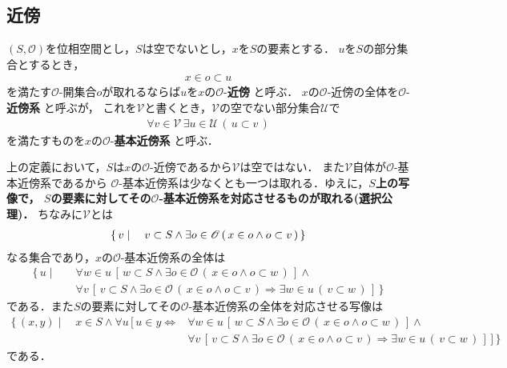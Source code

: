 \subsection{近傍}
	\begin{screen}
		\begin{dfn}[近傍]
			$(S,\mathscr{O})$を位相空間とし，$S$は空でないとし，$x$を$S$の要素とする．
			$u$を$S$の部分集合とするとき，
			\begin{align}
				x \in o \subset u
			\end{align}
			を満たす$\mathscr{O}$-開集合$o$が取れるならば$u$を$x$の$\mathscr{O}$-{\bf 近傍}
			と呼ぶ．
			$x$の$\mathscr{O}$-近傍の全体を$\mathscr{O}$-{\bf 近傍系}
			と呼ぶが，
			これを$\mathscr{V}$と書くとき，$\mathscr{V}$の空でない部分集合$\mathscr{U}$で
			\begin{align}
				\forall v \in \mathscr{V}\, \exists u \in \mathscr{U}\,
				(\, u \subset v\, )
			\end{align}
			を満たすものを$x$の$\mathscr{O}$-{\bf 基本近傍系}
			と呼ぶ．
		\end{dfn}
	\end{screen}
	
	上の定義において，$S$は$x$の$\mathscr{O}$-近傍であるから$\mathscr{V}$は空ではない．
	また$\mathscr{V}$自体が$\mathscr{O}$-基本近傍系であるから
	$\mathscr{O}$-基本近傍系は少なくとも一つは取れる．ゆえに，{\bf $S$上の写像で，
	$S$の要素に対してその$\mathscr{O}$-基本近傍系を対応させるものが取れる(選択公理)．}
	ちなみに$\mathscr{V}$とは
	\begin{align}
		\left\{\, v \mid \quad v \subset S \wedge \exists o \in \mathscr{O}\, (\, x \in o \wedge o \subset v\, )\, \right\}
	\end{align}
	なる集合であり，$x$の$\mathscr{O}$-基本近傍系の全体は
	\begin{align}
		\{\, u \mid \quad &\forall w \in u\, [\, w \subset S \wedge \exists o \in \mathscr{O}\, (\, x \in o \wedge o \subset w\, )\, ] \wedge \\
		&\forall v\, \left[\, v \subset S \wedge \exists o \in \mathscr{O}\, (\, x \in o \wedge o \subset v\, )
		\Longrightarrow \exists w \in u\, (\, v \subset w\, )\, \right]\, \}
	\end{align}
	である．また$S$の要素に対してその$\mathscr{O}$-基本近傍系の全体を対応させる写像は
	\begin{align}
		\{\, (x,y) \mid \quad x \in S \wedge
		\forall u\, [\, u \in y \Longleftrightarrow 
		&\forall w \in u\, [\, w \subset S \wedge \exists o \in \mathscr{O}\, (\, x \in o \wedge o \subset w\, )\, ] \wedge \\
		&\forall v\, \left[\, v \subset S \wedge \exists o \in \mathscr{O}\, (\, x \in o \wedge o \subset v\, )
		\Longrightarrow \exists w \in u\, (\, v \subset w\, )\, \right]\, ]\, \}
	\end{align}
	である．
	
